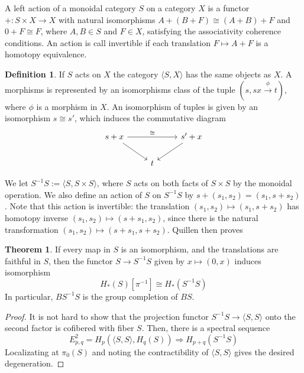 \documentclass{article}
\theoremstyle{definition}
\newtheorem{theorem}{Theorem}[section]
\theoremstyle{definition}
\newtheorem{definition}{Definition}[theorem]
\theoremstyle{definition}
\theoremstyle{definition}
\theoremstyle{definition}
\theoremstyle{definition}
\theoremstyle{definition}
\begin{document}
A left action of a monoidal category $S$ on a category $X$ is a functor $+: S\times X\to X$ with natural isomorphisms $A+(B+F)\cong (A+B)+F$ and $0+F\cong F$, where $A,B\in S$ and $F\in X$, satisfying the associativity coherence conditions. An action is call invertible if each translation $F\mapsto A+F$ is a homotopy equivalence. 
\begin{tcolorbox}[colback=purple!5!white,colframe=purple!75!black]
\begin{definition}
If $S$ acts on $X$ the category $\langle S,X \rangle$ has the same objects as $X$. A morphisms is represented by an isomorphisms class of the tuple $(s,sx\xrightarrow{\phi}t)$, where $\phi$ is a morphism in $X$. An isomorphism of tuples is given by an isomorphism $s\cong s'$, which induces the commutative diagram
\[\begin{tikzcd}
s+x\arrow[rr,"\cong"]\arrow[dr]&& s'+x\arrow[dl]\\
&t
\end{tikzcd}\]
\end{definition}
\end{tcolorbox}
We let $S^{-1}S:= \langle S, S\times S \rangle$, where $S$ acts on both facts of $S\times S$ by the monoidal operation. We also define an action of $S$ on $S^{-1}S$ by $s+(s_1,s_2)=(s_1,s+s_2)$. Note that this action is invertible: the translation $(s_1,s_2)\mapsto (s_1,s+s_2)$ has homotopy inverse $(s_1,s_2)\mapsto (s+s_1,s_2)$, since there is the natural transformation $(s_1,s_2)\mapsto (s+s_1,s+s_2)$. Quillen then proves 

\begin{tcolorbox}[colback=red!5!white,colframe=red!30!white]
\begin{theorem}
If every map in $S$ is an isomorphism, and the translations are faithful in $S$, then the functor $S\to S^{-1}S$ given by $x\mapsto (0,x)$ induces isomorphism
\[H_*(S)[\pi^{-1}]\cong H_*(S^{-1}S)\]
In particular, $BS^{-1}S$ is the group completion of $BS$.
\end{theorem}
\end{tcolorbox}
\begin{proof}
    It is not hard to show that the projection functor $S^{-1}S\to \langle S,S \rangle$ onto the second factor is cofibered with fiber $S$. Then, there is a spectral sequence \cite{Grayson} 
    \[E^2_{p,q}=H_p(\langle S,S \rangle, H_q(S))\Rightarrow H_{p+q}(S^{-1}S)\]
    Localizating at $\pi_0(S)$ and noting the contractibility of $\langle S,S\rangle$ gives the desired degeneration. 
\end{proof}
\end{document}
